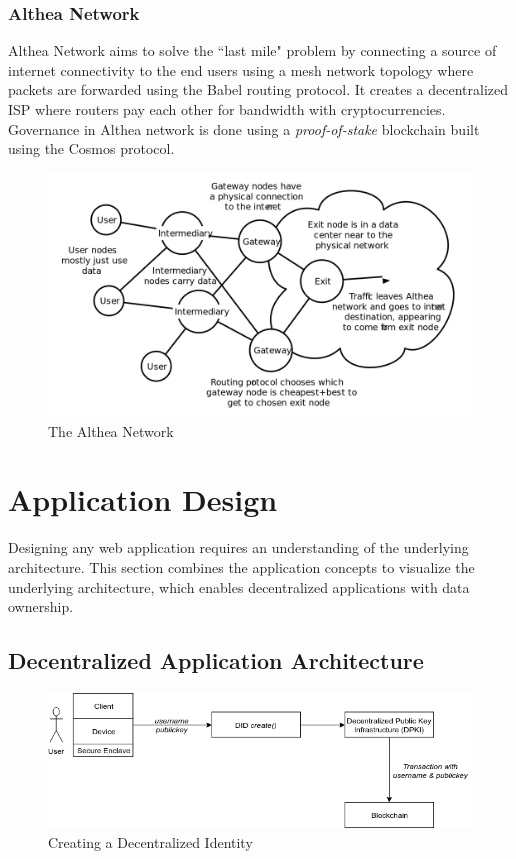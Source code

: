 		\subsubsection{Althea Network}
		Althea\cite{althea:whitepaper:1} Network aims to solve the ``last mile" problem by connecting a source of internet connectivity to the end users using a mesh network topology where packets are forwarded using the Babel routing protocol\cite{chroboczek2011babel}. It creates a decentralized ISP where routers pay each other for bandwidth with cryptocurrencies. Governance in Althea network is done using a \textit{proof-of-stake} blockchain built using the Cosmos\cite{cosmos:network:1} protocol.
		
		\begin{figure}[h]
			\includegraphics[width=\linewidth]{figures/althea-network}
			\caption{\label{fig:althea-network} The Althea Network\protect\footnotemark}
		\end{figure}

\cleardoublepage
\section{Application Design}
	Designing any web application requires an understanding of the underlying architecture. This section combines the application concepts to visualize the underlying architecture, which enables decentralized applications with data ownership.
	
	\subsection{Decentralized Application Architecture}
	\begin{figure}[h]
		\includegraphics[width=\linewidth]{figures/did-create}
		\caption{\label{fig:did-create} Creating a Decentralized Identity}
	\end{figure}

